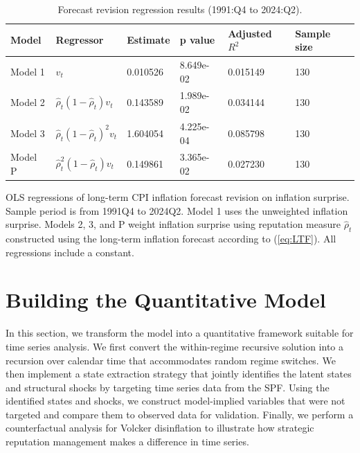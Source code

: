 \documentclass[12pt,letter,leqno]{article}
\theoremstyle{asn}
\theoremstyle{lem}
\theoremstyle{slem}
\theoremstyle{prop}
\theoremstyle{appprop}
\theoremstyle{rem}
\theoremstyle{defn}
\begin{document}
\begin{table}[htbp]
  \centering
  \caption{Forecast revision regression results (1991:Q4 to 2024:Q2).}
  \begin{tabular}{@{}llllll@{}}
  \toprule
  Model & Regressor & Estimate & p value & Adjusted $R^2$ & Sample size \\
  \midrule
  Model 1 & $v_t$ & 0.010526 & 8.649e-02 & 0.015149 & 130 \\
  Model 2 & $\widehat{\rho}_t(1-\widehat{\rho}_t) v_t$ & 0.143589 & 1.989e-02 & 0.034144 & 130 \\
  Model 3 & $\widehat{\rho}_t(1-\widehat{\rho}_t)^2 v_t$ & 1.604054 & 4.225e-04 & 0.085798 & 130 \\
  Model P & $\widehat{\rho}^2_t(1-\widehat{\rho}_t) v_t$ & 0.149861 & 3.365e-02 & 0.027230 & 130 \\
  \bottomrule
  \end{tabular}
  \label{tab:regression}%

\begin{flushleft}
\footnotesize{OLS regressions of long-term CPI inflation forecast revision on inflation surprise. Sample period is from 1991Q4 to 2024Q2. Model 1 uses the unweighted inflation surprise. Models 2, 3, and P weight inflation surprise using reputation measure $\widehat{\rho}_t$ constructed using the long-term inflation forecast according to (\ref{eq:LTF}). All regressions include a constant.}
\end{flushleft}
  \end{table}


\section{Building the Quantitative Model}
\label{sec:buildingmodel}

In this section, we transform the model into a quantitative framework suitable for time series analysis. We first convert the within-regime recursive solution into a recursion over calendar time that accommodates random regime switches. We then implement a state extraction strategy that jointly identifies the latent states and structural shocks by targeting time series data from the SPF. Using the identified states and shocks, we construct model-implied variables that were not targeted and compare them to observed data for validation. Finally, we perform a counterfactual analysis for Volcker disinflation to illustrate how strategic reputation management makes a difference in time series.
\end{document}
